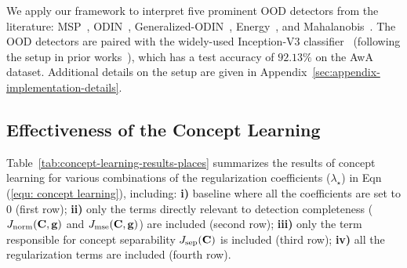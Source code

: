 


We apply our framework to interpret five prominent OOD detectors from the literature: MSP~\citep{hendrycks2016msp}, ODIN~\citep{liang2018ODIN}, Generalized-ODIN~\citep{hsu2020GeneralizedODIN}, Energy~\citep{liu2020energy}, and Mahalanobis~\citep{lee2018mahalanobis}.
The OOD detectors are paired with the widely-used Inception-V3 classifier~\citep{szegedy2016inception-v3} (following the setup in prior works~\citep{yeh2020completeness, ghorbani2019ace, kim2018tcav}), which has a test accuracy of $92.13 \%$ on the AwA dataset.
%
Additional details on the setup are given in Appendix~\ref{sec:appendix-implementation-details}.
 
\subsection{Effectiveness of the Concept Learning}
\label{sec:eval-concept}
Table~\ref{tab:concept-learning-results-places} summarizes the results of concept learning for various combinations of the regularization coefficients ($\lambda_{\star}$) in Eqn (\ref{equ: concept learning}), including: \textbf{i)} baseline where all the coefficients are set to $0$ (first row); \textbf{ii)} only the terms directly relevant to detection completeness (\ie $J_{\textrm{norm}}(\mathbf{C}, \mathbf{g})$ and $J_{\textrm{mse}}(\mathbf{C}, \mathbf{g})$) are included (second row); \textbf{iii)} only the term responsible for concept separability $J_{\textrm{sep}}(\mathbf{C})$ is included (third row); \textbf{iv)} all the regularization terms are included (fourth row).


